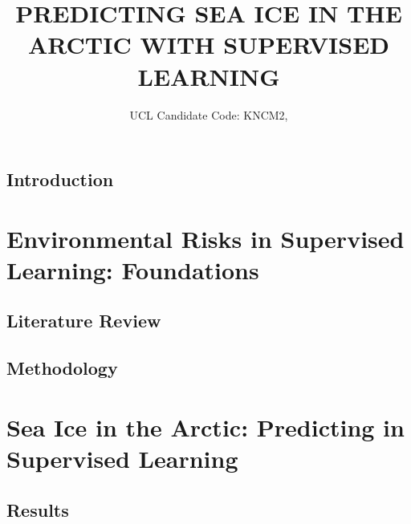 \documentclass[12pt]{report}
\begin{document}
\title{PREDICTING SEA ICE IN THE ARCTIC WITH SUPERVISED LEARNING}
\author{UCL Candidate Code: KNCM2, }



\beforepreface
\hypersetup{linkcolor=magenta}

\hypersetup{linkcolor=.}

\afterpreface
\hypersetup{linkcolor=magenta}



\chapter{Introduction}                          %
\label{Chapter1:intro}



\part{Environmental Risks in Supervised Learning: Foundations}

\chapter{Literature Review}                     %
\label{Chapter2:review}



\chapter{Methodology}                           %
\label{Chapter3:method}





\part{Sea Ice in the Arctic: Predicting in Supervised Learning}


\chapter{Results}                               %
\label{Chapter4:results}


\end{document}
